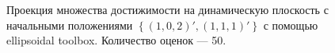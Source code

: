 \documentclass[10pt, a4paper]{article}
\begin{document}
\begin{figure}[H]
\caption{Проекция множества достижимости на динамическую плоскость с начальными положениями $\left\{(1,0,2)',(1,1,1)'\right\}$ с помощью ellipsoidal toolbox. Количество оценок --- 50.}
\end{figure}
\end{document}
